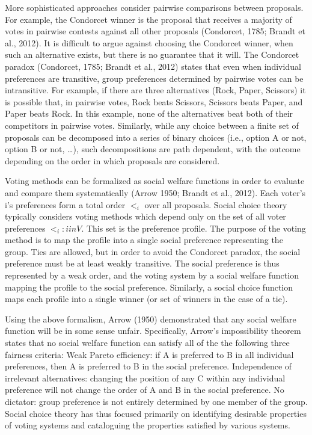 More sophisticated approaches consider pairwise comparisons between proposals. For example, the Condorcet winner is the proposal that receives a majority of votes in pairwise contests against all other proposals (Condorcet, 1785; Brandt et al., 2012). It is difficult to argue against choosing the Condorcet winner, when such an alternative exists, but there is no guarantee that it will. The Condorcet paradox (Condorcet, 1785; Brandt et al., 2012) states that even when individual preferences are transitive, group preferences determined by pairwise votes can be intransitive. For example, if there are three alternatives (Rock, Paper, Scissors) it is possible that, in pairwise votes, Rock beats Scissors, Scissors beats Paper, and Paper beats Rock. In this example, none of the alternatives beat both of their competitors in pairwise votes. Similarly, while any choice between a finite set of proposals can be decomposed into a series of binary choices (i.e., option A or not, option B or not, …), such decompositions are path dependent, with the outcome depending on the order in which proposals are considered.

Voting methods can be formalized as social welfare functions in order to evaluate and compare them systematically (Arrow 1950; Brandt et al., 2012). Each voter’s i’s preferences form a total order $<_i$ over all proposals. Social choice theory typically considers voting methods which depend only on the set of all voter preferences ${<_i: i in V}$. This set is the preference profile. The purpose of the voting method is to map the profile into a single social preference representing the group. Ties are allowed, but in order to avoid the Condorcet paradox, the social preference must be at least weakly transitive. The social preference is thus represented by a weak order, and the voting system by a social welfare function mapping the profile to the social preference. Similarly, a social choice function maps each profile into a single winner (or set of winners in the case of a tie).

Using the above formalism, Arrow (1950) demonstrated that any social welfare function will be in some sense unfair. Specifically, Arrow’s impossibility theorem states that no social welfare function can satisfy all of the the following three fairness criteria:
Weak Pareto efficiency: if A is preferred to B in all individual preferences, then A is preferred to B in the social preference.
Independence of irrelevant alternatives: changing the position of any C within any individual preference will not change the order of A and B in the social preference.
No dictator: group preference is not entirely determined by one member of the group.
Social choice theory has thus focused primarily on identifying desirable properties of voting systems and cataloguing the properties satisfied by various systems.

